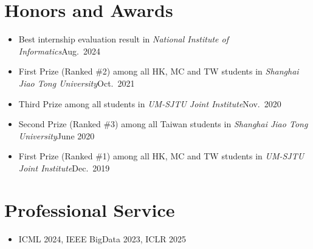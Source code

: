\documentclass[letterpaper,10.8pt]{article}
\begin{document}
\section{Honors and Awards}
\begin{itemize}
      \item {}
            {Best internship evaluation result in \emph{National Institute of Informatics}}{Aug.\ 2024}

      \item {}
            {First Prize (Ranked \#2) among all HK, MC and TW students in \emph{Shanghai Jiao Tong University}}{Oct.\ 2021}

      \item {}
            {Third Prize among all students in \emph{UM-SJTU Joint Institute}}{Nov.\ 2020}

      \item {}
            {Second Prize (Ranked \#3) among all Taiwan students in \emph{Shanghai Jiao Tong University}}{June 2020}

      \item {}
            {First Prize (Ranked \#1) among all HK, MC and TW students in \emph{UM-SJTU Joint Institute}}{Dec.\ 2019}
\end{itemize}

\section{Professional Service}
\begin{itemize}
      \item {}
            {ICML 2024, IEEE BigData 2023, ICLR 2025}{}
\end{itemize}
\end{document}
